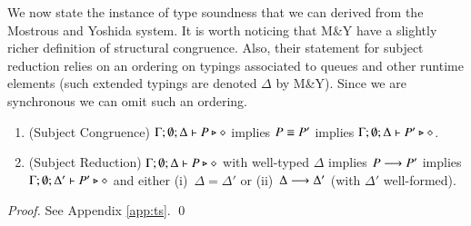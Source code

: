 We now state the instance of type soundness that we can derived from the Mostrous and Yoshida system.
It is worth noticing that M\&Y have a slightly richer definition of structural congruence.
Also, their statement for subject reduction relies on an ordering on typings associated to queues and other 
runtime elements (such extended typings are denoted $\Delta$ by M\&Y).
Since we are synchronous we can omit such an ordering.

\begin{theorem}\label{t:sr}\rm
%
	\begin{enumerate}[1.]
		\item	(Subject Congruence)
			$\Gamma; \emptyset; \Delta \vdash P \triangleright \diamond$
			implies
			$P \equiv P'$ implies $\Gamma; \emptyset; \Delta \vdash P' \triangleright \diamond$.

		\item	(Subject Reduction)
			$\Gamma; \emptyset; \Delta \vdash P \triangleright \diamond$
			with
			well-typed $\Delta$
			implies
			$P \longrightarrow P'$ implies $\Gamma; \emptyset; \Delta'  \vdash P' \triangleright \diamond$
			and either (i)~$\Delta = \Delta'$ or (ii)~$\Delta \longrightarrow \Delta'$
			(with $\Delta'$ well-formed).
	\end{enumerate}
\end{theorem}

\begin{proof}
	See Appendix \ref{app:ts}.
	\qed
\end{proof}
